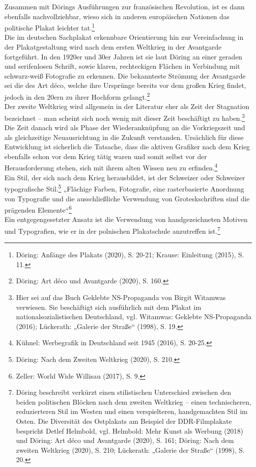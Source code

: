 \documentclass[a4paper,12pt,ngerman]{article}
\begin{document}
Zusammen mit Dörings Ausführungen zur französischen Revolution, ist es dann ebenfalls nachvollziehbar, wieso sich in anderen europäischen Nationen das politische Plakat leichter tat.\footnote{Döring: Anfänge des Plakats (2020), S. 20-21; Krause: Einleitung (2015), S. 11.} \\
Die im deutschen Sachplakat erkennbare Orientierung hin zur Vereinfachung in der Plakatgestaltung wird nach dem ersten Weltkrieg in der Avantgarde fortgeführt. In den 1920er und 30er Jahren ist sie laut Döring an einer geraden und serifenlosen Schrift, sowie klaren, rechteckigen Flächen in Verbindung mit schwarz-weiß Fotografie zu erkennen. Die bekannteste Strömung der Avantgarde sei die des Art déco, welche ihre Ursprünge bereits vor dem großen Krieg findet, jedoch in den 20ern zu ihrer Hochform gelangt.\footnote{Döring: Art déco und Avantgarde (2020), S. 160.} \\
Der zweite Weltkrieg wird allgemein in der Literatur eher als Zeit der Stagnation bezeichnet -- man scheint sich noch wenig mit dieser Zeit beschäftigt zu haben.\footnote{Hier sei auf das Buch Geklebte NS-Propaganda von Birgit Witamwas verwiesen. Sie beschäftigt sich ausführlich mit dem Plakat im nationalsozialistischen Deutschland, vgl. Witamwas: Geklebte NS-Propaganda (2016); Lückerath: „Galerie der Straße“ (1998), S. 19.}  Die Zeit danach wird als Phase der Wiederanknüpfung an die Vorkriegszeit und als gleichzeitige Neuausrichtung in die Zukunft verstanden. Ursächlich für diese Entwicklung ist sicherlich die Tatsache, dass die aktiven Grafiker nach dem Krieg ebenfalls schon vor dem Krieg tätig waren und somit selbst vor der Herausforderung stehen, sich mit ihrem alten Wissen neu zu erfinden.\footnote{Kühnel: Werbegrafik in Deutschland seit 1945 (2016), S. 20-25.} \\
Ein Stil, der sich nach dem Krieg herausbildet, ist der Schweizer oder Schweizer typografische Stil.\footnote{Döring: Nach dem Zweiten Weltkrieg (2020), S. 210.}  „Flächige Farben, Fotografie, eine rasterbasierte Anordnung von Typografie und die ausschließliche Verwendung von Groteskschriften sind die prägenden Elemente“\footnote{Zeller: World Wide Willisau (2017), S. 9.} \\
Ein entgegengesetzter Ansatz ist die Verwendung von handgezeichneten Motiven und Typografien, wie er in der polnischen Plakatschule anzutreffen ist.\footnote{Döring beschreibt verkürzt einen stilistischen Unterschied zwischen den beiden politischen Blöcken nach dem zweiten Weltkrieg -- einen technischeren, reduzierteren Stil im Westen und einen verspielteren, handgemachten Stil im Osten. Die Diversität des Ostplakats am Beispiel der DDR-Filmplakate bespricht Detlef Helmbold, vgl. Helmbold: Mehr Kunst als Werbung (2018) und Döring: Art déco und Avantgarde (2020), S. 161; Döring: Nach dem zweiten Weltkrieg (2020), S. 210; Lückerath: „Galerie der Straße“ (1998), S. 20.} \\
\end{document}
